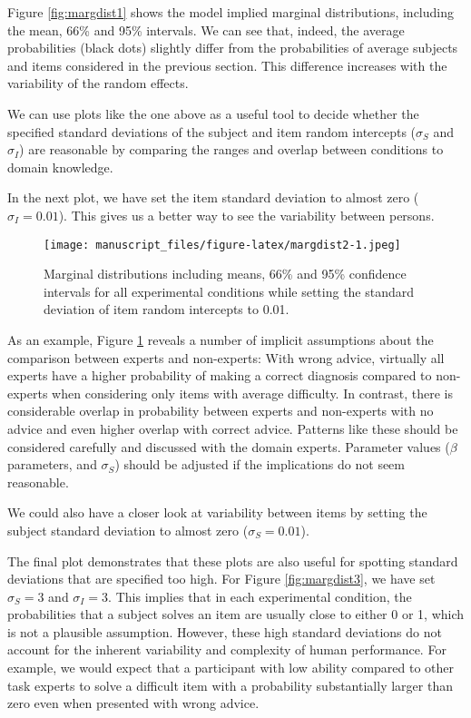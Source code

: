 \documentclass[
  man,floatsintext]{apa6}
\begin{document}
Figure \ref{fig:margdist1} shows the model implied marginal distributions, including the mean, 66\% and 95\% intervals. We can see that, indeed, the average probabilities (black dots) slightly differ from the probabilities of average subjects and items considered in the previous section. This difference increases with the variability of the random effects.

We can use plots like the one above as a useful tool to decide whether the specified standard deviations of the subject and item random intercepts (\(\sigma_S\) and \(\sigma_I\)) are reasonable by comparing the ranges and overlap between conditions to domain knowledge.

In the next plot, we have set the item standard deviation to almost zero (\(\sigma_I = 0.01\)). This gives us a better way to see the variability between persons.



\begin{figure}
\centering
\texttt{[image: manuscript\_files/figure-latex/margdist2-1.jpeg]}
\caption{\label{fig:margdist2}Marginal distributions including means, 66\% and 95\% confidence intervals for all experimental conditions while setting the standard deviation of item random intercepts to 0.01.}
\end{figure}

As an example, Figure \ref{fig:margdist2} reveals a number of implicit assumptions about the comparison between experts and non-experts: With wrong advice, virtually all experts have a higher probability of making a correct diagnosis compared to non-experts when considering only items with average difficulty. In contrast, there is considerable overlap in probability between experts and non-experts with no advice and even higher overlap with correct advice. Patterns like these should be considered carefully and discussed with the domain experts. Parameter values (\(\beta\) parameters, and \(\sigma_S\)) should be adjusted if the implications do not seem reasonable.

We could also have a closer look at variability between items by setting the subject standard deviation to almost zero (\(\sigma_S = 0.01\)).

The final plot demonstrates that these plots are also useful for spotting standard deviations that are specified too high. For Figure \ref{fig:margdist3}, we have set \(\sigma_S = 3\) and \(\sigma_I = 3\). This implies that in each experimental condition, the probabilities that a subject solves an item are usually close to either 0 or 1, which is not a plausible assumption. However, these high standard deviations do not account for the inherent variability and complexity of human performance. For example, we would expect that a participant with low ability compared to other task experts to solve a difficult item with a probability substantially larger than zero even when presented with wrong advice.
\end{document}

